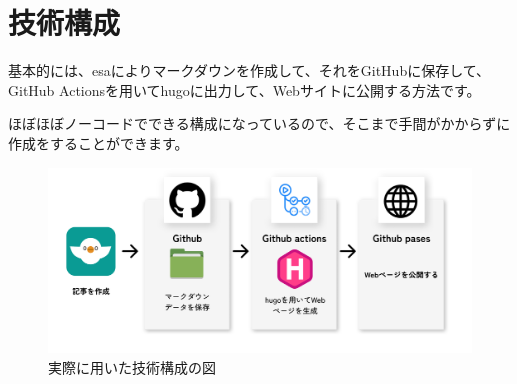 \chapter{技術構成}
基本的には、esaによりマークダウンを作成して、それをGitHubに保存して、GitHub Actionsを用いてhugoに出力して、Webサイトに公開する方法です。

ほぼほぼノーコードでできる構成になっているので、そこまで手間がかからずに作成をすることができます。

\begin{figure}[H]
  \centering
  \includegraphics[width=14cm]{./image/02-chap4/flow.png}
  \caption{実際に用いた技術構成の図}
  \label{chap4-flow-image}
\end{figure}